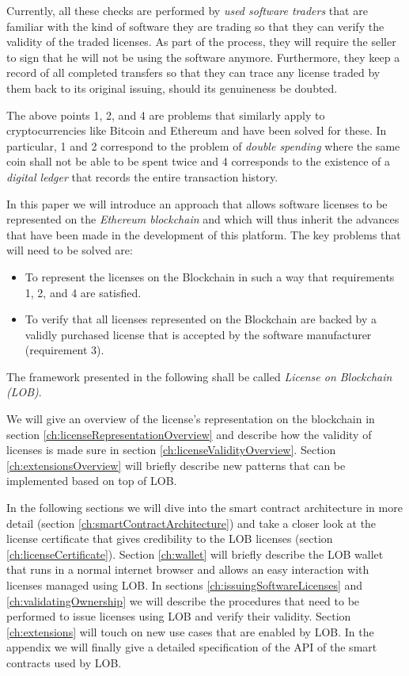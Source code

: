 \documentclass[a4paper]{article}
\begin{document}
Currently, all these checks are performed by \emph{used software traders} that are familiar with the kind of software they are trading so that they can verify the validity of the traded licenses. As part of the process, they will require the seller to sign that he will not be using the software anymore. Furthermore, they keep a record of all completed transfers so that they can trace any license traded by them back to its original issuing, should its genuineness be doubted. 

The above points 1, 2, and 4 are problems that similarly apply to cryptocurrencies like Bitcoin and Ethereum and have been solved for these. In particular, 1 and 2 correspond to the problem of \emph{double spending} where the same coin shall not be able to be spent twice and 4 corresponds to the existence of a \emph{digital ledger} that records the entire transaction history.

In this paper we will introduce an approach that allows software licenses to be represented on the \emph{Ethereum blockchain} and which will thus inherit the advances that have been made in the development of this platform. The key problems that will need to be solved are:
\begin{itemize}
  \item To represent the licenses on the Blockchain in such a way that requirements 1, 2, and 4 are satisfied.
  \item To verify that all licenses represented on the Blockchain are backed by a validly purchased license that is accepted by the software manufacturer (requirement 3).
\end{itemize}

The framework presented in the following shall be called \emph{License on Blockchain (LOB)}.

We will give an overview of the license's representation on the blockchain in section \ref{ch:licenseRepresentationOverview} and describe how the validity of licenses is made sure in section \ref{ch:licenseValidityOverview}. Section \ref{ch:extensionsOverview} will briefly describe new patterns that can be implemented based on top of LOB.

In the following sections we will dive into the smart contract architecture in more detail (section \ref{ch:smartContractArchitecture}) and take a closer look at the license certificate that gives credibility to the LOB licenses (section \ref{ch:licenseCertificate}). Section \ref{ch:wallet} will briefly describe the LOB wallet that runs in a normal internet browser and allows an easy interaction with licenses managed using LOB. In sections \ref{ch:issuingSoftwareLicenses} and \ref{ch:validatingOwnership} we will describe the procedures that need to be performed to issue licenses using LOB and verify their validity. Section \ref{ch:extensions} will touch on new use cases that are enabled by LOB. In the appendix we will finally give a detailed specification of the API of the smart contracts used by LOB.
\end{document}
